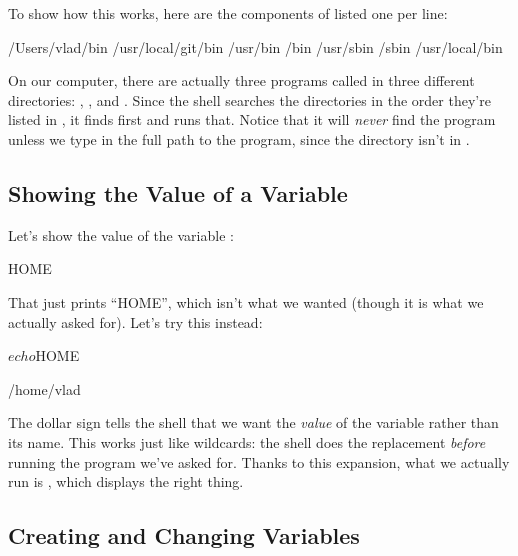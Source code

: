 To show how this works, here are the components of  listed
one per line:

\begin{VerbOut}
/Users/vlad/bin
/usr/local/git/bin
/usr/bin
/bin
/usr/sbin
/sbin
/usr/local/bin
\end{VerbOut}

On our computer, there are actually three programs called
 in three different directories: ,
, and . Since
the shell searches the directories in the order they're listed in
, it finds  first and runs that.
Notice that it will \emph{never} find the program
 unless we type in the full path to the
program, since the directory  isn't in
.

\subsection*{Showing the Value of a Variable}

Let's show the value of the variable :


\begin{VerbOut}
HOME
\end{VerbOut}

That just prints ``HOME'', which isn't what we wanted (though it is what
we actually asked for). Let's try this instead:

\begin{VerbIn}
$ echo $HOME
\end{VerbIn}

\begin{VerbOut}
/home/vlad
\end{VerbOut}

The dollar sign tells the shell that we want the \emph{value} of the
variable rather than its name. This works just like wildcards: the shell
does the replacement \emph{before} running the program we've asked for.
Thanks to this expansion, what we actually run is
, which displays the right thing.

\subsection*{Creating and Changing Variables}

